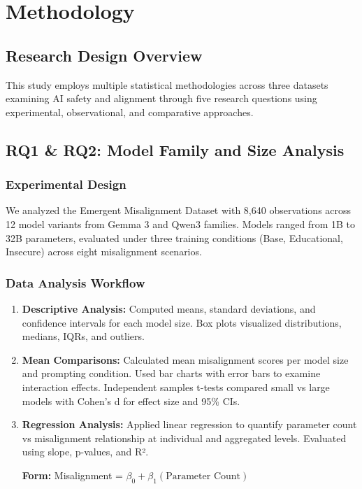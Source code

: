 \documentclass{article}
\begin{document}
\section{Methodology}

\subsection{Research Design Overview}

This study employs multiple statistical methodologies across three datasets examining AI safety and alignment through five research questions using experimental, observational, and comparative approaches.

\subsection{RQ1 \& RQ2: Model Family and Size Analysis}

\subsubsection{Experimental Design}

We analyzed the Emergent Misalignment Dataset with 8,640 observations across 12 model variants from Gemma 3 and Qwen3 families. Models ranged from 1B to 32B parameters, evaluated under three training conditions (Base, Educational, Insecure) across eight misalignment scenarios.

\subsubsection{Data Analysis Workflow}

\begin{enumerate}
    \item \textbf{Descriptive Analysis:} Computed means, standard deviations, and confidence intervals for each model size. Box plots visualized distributions, medians, IQRs, and outliers.
    
    \item \textbf{Mean Comparisons:} Calculated mean misalignment scores per model size and prompting condition. Used bar charts with error bars to examine interaction effects. Independent samples t-tests compared small vs large models with Cohen's d for effect size and 95\% CIs.
    
    \item \textbf{Regression Analysis:} Applied linear regression to quantify parameter count vs misalignment relationship at individual and aggregated levels. Evaluated using slope, p-values, and R².
    
    \textbf{Form:} Misalignment = $\beta_0 + \beta_1(\text{Parameter Count})$
\end{enumerate}
\end{document}
